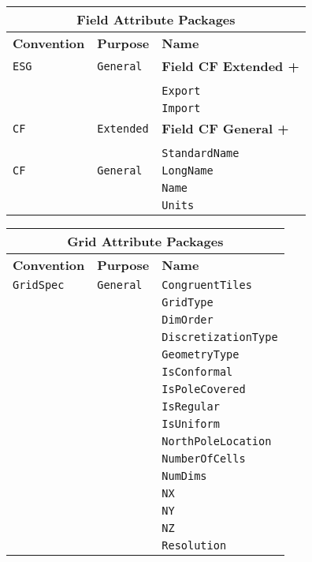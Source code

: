 \vspace{18pt}

\begin{tabular}{|p{4cm}|p{4cm}|p{6cm}|}
\hline
\multicolumn{3}{|c|}{{\bf \large Field Attribute Packages}} \\
\hline\hline
{\bf Convention} & {\bf Purpose} & {\bf Name} \\
\hline\hline
{\tt ESG} & {\tt General} & {\bf Field CF Extended +} \\
& & \\
& & {\tt Export}  \\
 & & {\tt Import} \\ 
\hline
{\tt CF} & {\tt Extended} & {\bf Field CF General +} \\
& & \\
& & {\tt StandardName}\\ 
\hline
{\tt CF} & {\tt General} & {\tt LongName}\\
     & & {\tt Name} \\
     & & {\tt Units}  \\
\hline
\end{tabular}
\label{FieldAttributePackages}

\begin{tabular}{|p{4cm}|p{4cm}|p{6cm}|}
\hline
\multicolumn{3}{|c|}{{\bf \large Grid Attribute Packages}} \\
\hline\hline
{\bf Convention} & {\bf Purpose} & {\bf Name} \\
\hline\hline
{\tt GridSpec} & {\tt General} & {\tt CongruentTiles} \\
 & & {\tt GridType} \\ 
 & & {\tt DimOrder} \\ 
 & & {\tt DiscretizationType} \\ 
 & & {\tt GeometryType} \\ 
 & & {\tt IsConformal} \\ 
 & & {\tt IsPoleCovered} \\ 
 & & {\tt IsRegular} \\ 
 & & {\tt IsUniform} \\ 
 & & {\tt NorthPoleLocation} \\ 
 & & {\tt NumberOfCells} \\ 
 & & {\tt NumDims} \\ 
 & & {\tt NX} \\ 
 & & {\tt NY} \\ 
 & & {\tt NZ} \\ 
 & & {\tt Resolution} \\ 
\hline
\end{tabular}
\label{GridAttributePackages}

